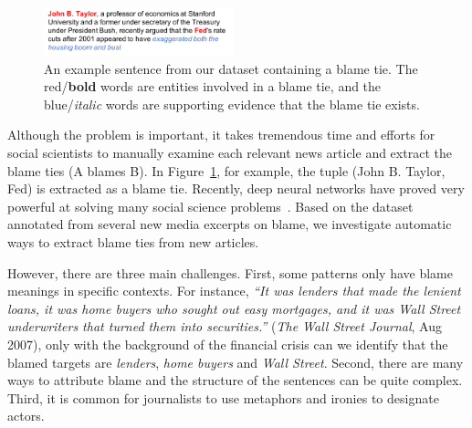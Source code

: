 \documentclass[letterpaper]{article} %
\begin{document}
\begin{figure}[t!]
\centering
\includegraphics[width=0.49\textwidth]{demosm}
\caption{An example sentence from our dataset containing a blame tie. The red/{\bf bold} words are entities involved in a blame tie, and the blue/{\it italic} words are supporting evidence that the blame tie exists.}
\label{figure:introdemo}
\end{figure}

Although the problem is important, it takes tremendous time and efforts for social scientists to manually examine each relevant news article and extract the blame ties (A blames B). In Figure~\ref{figure:introdemo}, for example, the tuple (John B. Taylor, Fed) is extracted as a blame tie. Recently, deep neural networks have proved very powerful at solving many social science problems~\cite{li-hovy:2014:EMNLP20141,rule2015lexical,bail2016combining}. Based on the dataset annotated from several new media excerpts on blame, we investigate automatic ways to extract blame ties from new articles.

However, there are three main challenges. First, some patterns only have blame meanings in specific contexts. For instance, {\it ``It was lenders that made the lenient loans, it was home buyers who sought out easy mortgages, and it was Wall Street underwriters that turned them into securities.''} ({\it The Wall Street Journal}, Aug 2007), only with the background of the financial crisis can we identify that the blamed targets are {\it lenders}, {\it home buyers} and {\it Wall Street}. Second, there are many ways to attribute blame and the structure of the sentences can be quite complex. Third, it is common for journalists to use metaphors and ironies to designate actors.
\end{document}
